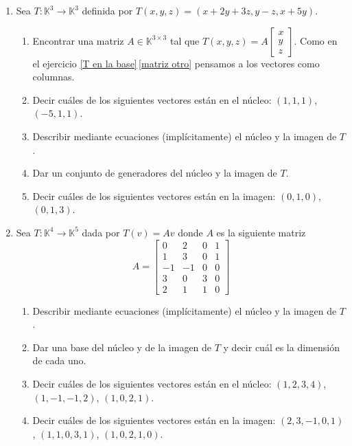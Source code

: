 \begin{enumerate}[topsep=6pt, itemsep=.4cm]
    \item\label{Txyz} Sea $T:\mathbb{K}^3\longrightarrow\mathbb{K}^3$ definida por $T(x,y,z)=(x+2y+3z, y-z,x+5y)$.
        \begin{enumerate}
        \item\label{matriz de T} Encontrar una matriz  $A\in\mathbb{K}^{3\times 3}$ tal que $T(x,y,z)=A\begin{bmatrix}
                x\\y\\z \end{bmatrix}
                $.  Como en el ejercicio  \ref{T en la base}\,\ref{matriz otro} pensamos a los vectores como columnas.
        \item\label{Txyz-vectores-nucleo} Decir cuáles de los siguientes vectores están en el núcleo: $(1,1,1)$, $(-5,1,1)$.
        \item\label{Txyz nucleo imagen de T implicito} Describir mediante ecuaciones (implícitamente) el núcleo y la imagen de $T$.
        \item\label{Txyz  nucleo imagen T generadores} Dar un conjunto de generadores del núcleo y la imagen de $T$.
        \item\label{Txyz imagen} Decir cuáles de los siguientes vectores están en la imagen: $(0,1,0)$, $(0,1,3)$.
        \end{enumerate}


\item Sea $T: \mathbb{K}^4 \to \mathbb{K}^5$ dada por $T(v) = Av$ donde $A$ es la siguiente matriz
    $$
    A=\begin{bmatrix}
    0& 2& 0&1\\   1& 3& 0&1\\  -1&-1&0&0\\3&0&3&0\\2&1&1&0 \end{bmatrix}
    $$
    \begin{enumerate}[topsep=5pt,itemsep=5pt]
        \item Describir mediante ecuaciones (implícitamente) el núcleo y la imagen de $T$.
        \item Dar una base del núcleo y de la imagen de $T$ y decir cuál es la dimensión de cada uno. 
        \item Decir cuáles de los siguientes vectores están en el núcleo:
        $(1,2,3,4)$, $(1,-1,-1,2)$, $(1,0,2,1)$.
        \item Decir cuáles de los siguientes vectores están en la imagen:
        $(2,3,-1,0,1)$, $(1,1,0,3,1)$, $(1,0,2,1,0)$.
    \end{enumerate}
    


\end{enumerate}
